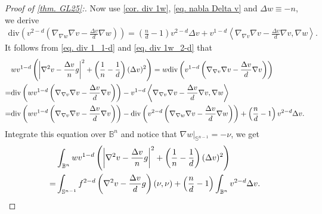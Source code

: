 \documentclass[12pt]{amsart}
\numberwithin{equation}{section}
\numberwithin{lemma}{section}
\numberwithin{proposition}{section}
\numberwithin{corollary}{section}
\numberwithin{remark}{section}
\begin{document}
\begin{proof}[Proof of \cref{thm. GL25}:]
    Now use \cref{cor. div 1w}, \cref{eq. nabla Delta v} and $\Delta w\equiv-n$, we derive
    \begin{align}\label{eq. div 1w_2-d}
        \mathrm{div}\left(
        v^{2-d}
        \left(\nabla_{\nabla w}\nabla v-\frac{\Delta v}{d}\nabla w\right)
        \right)
        =\left(\frac{n}{d}-1\right)v^{2-d}\Delta v
        +v^{1-d}
        \left\langle\nabla_{\nabla v}\nabla v-\frac{\Delta v}{d}\nabla v,\nabla w\right\rangle.
    \end{align}
    It follows from \cref{eq. div 1_1-d} and \cref{eq. div 1w_2-d} that
    \begin{align*}
        &wv^{1-d}\left(
        \left|\nabla^2 v-\frac{\Delta v}{n}g\right|^2
        +\left(\frac{1}{n}-\frac{1}{d}\right)(\Delta v)^2
        \right)
        =w\mathrm{div}\left(
        v^{1-d}\left(\nabla_{\nabla v}\nabla v-\frac{\Delta v}{d}\nabla v\right)
        \right)\notag\\
        =&\mathrm{div}\left(
        wv^{1-d}
        \left(\nabla_{\nabla v}\nabla v-\frac{\Delta v}{d}\nabla v\right)
        \right)
        -v^{1-d}\left\langle\nabla_{\nabla v}\nabla v-\frac{\Delta v}{d}\nabla v,\nabla w\right\rangle\notag\\
        =&\mathrm{div}\left(
        wv^{1-d}\left(\nabla_{\nabla v}\nabla v-\frac{\Delta v}{d}\nabla v\right)
        \right)
        -\mathrm{div}\left(
        v^{2-d}
        \left(\nabla_{\nabla w}\nabla v-\frac{\Delta v}{d}\nabla w\right)
        \right)
        +\left(\frac{n}{d}-1\right)v^{2-d}\Delta v.
    \end{align*}
    Integrate this equation over $\mathbb{B}^n$ and notice that $\nabla w|_{\mathbb{S}^{n-1}}=-\nu$, we get
    \begin{align}\label{eq. 1w_2-d}
        &\int_{\mathbb{B}^n}wv^{1-d}\left(
        \left|\nabla^2 v-\frac{\Delta v}{n}g\right|^2
        +\left(\frac{1}{n}-\frac{1}{d}\right)(\Delta v)^2
        \right)\notag\\
        =&\int_{\mathbb{S}^{n-1}}f^{2-d}\left(\nabla^2 v-\frac{\Delta v}{d}g\right)(\nu,\nu)
        +\left(\frac{n}{d}-1\right)
        \int_{\mathbb{B}^n}v^{2-d}\Delta v.
    \end{align}


\end{proof}
\end{document}
